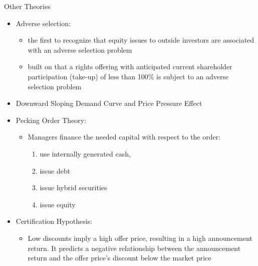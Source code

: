 \documentclass{beamer}
\begin{document}
	\begin{frame}{Other Theories}
		\begin{itemize}\tiny
			\item Adverse selection: 
			\begin{itemize}
				\tiny
				\item \cite{myers1984corporate} the first to recognize that equity issues to outside investors are associated with an adverse selection problem
				\item \cite{ECKBO1992293}  built on that a rights
				offering with anticipated current shareholder participation (take-up) of less than 100\% is subject to an adverse selection problem
			\end{itemize}
			\item  Downward Sloping Demand Curve and Price Pressure
			Effect
			\item  Pecking Order Theory:
			\begin{itemize}
				\tiny \item  Managers finance
				the needed capital with respect to the order:\begin{enumerate}\tiny
					\item use internally generated cash, \item issue
					debt \item issue hybrid securities \item issue equity
				\end{enumerate}
			\end{itemize}
			\item Certification Hypothesis:
			\begin{itemize}\tiny
				\item Low discounts imply a
				high offer price, resulting in a high announcement return. It predicts a negative
				relationship between the announcement return and the offer price’s discount below the
				market price
			\end{itemize}
		\end{itemize}
	\end{frame}
	
	
	
\end{document}

